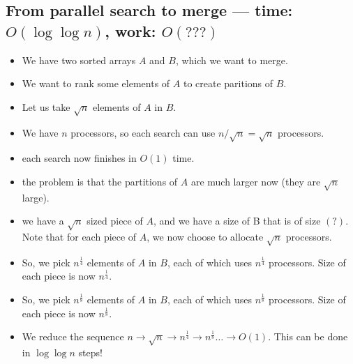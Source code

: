 \subsection{From parallel search to merge --- time: $O(\log \log n)$, work: $O(???)$ }
\begin{itemize}
    \item We have two sorted arrays $A$ and $B$, which we want to merge.
    \item We want to rank some elements of $A$ to create paritions of $B$.
    \item Let us take $\sqrt n$ elements of $A$ in $B$.
    \item We have $n$ processors, so each search can use $ n / \sqrt n = \sqrt n$ processors.
    \item each search now finishes in $O(1)$  time.
    \item the problem is that the partitions of $A$ are much larger now (they are $\sqrt n$ large).
    \item we have a $\sqrt n$ sized piece of $A$, and we have a size of B that is of size $(?)$.
        Note that for each piece of $A$, we now choose to allocate $\sqrt n$ processors.
    \item So, we pick $n^\frac{1}{4}$ elements of $A$ in $B$, each of which
        uses $n^\frac{1}{4}$ processors. Size of each piece is now $n^\frac{1}{4}$.
    \item So, we pick $n^\frac{1}{8}$ elements of $A$ in $B$, each of which
        uses $n^\frac{1}{8}$ processors. Size of each piece is now $n^\frac{1}{8}$.
    \item We reduce the sequence $n \to \sqrt n \to n^{\frac{1}{4}} \to n^\frac{1}{8} \dots \to O(1)$.
        This can be done in $\log \log n$ steps!
\end{itemize}
